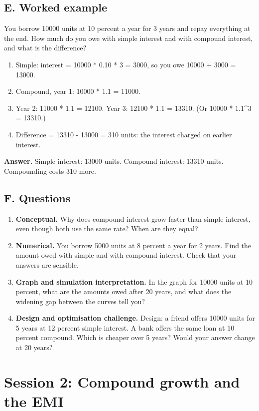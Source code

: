 \documentclass[11pt,a4paper]{article}
\begin{document}
\subsection*{E. Worked example}
You borrow 10000 units at 10 percent a year for 3 years and repay everything at the end. How much do you owe with simple interest and with compound interest, and what is the difference?
\begin{enumerate}[nosep]
\item Simple: interest = 10000 * 0.10 * 3 = 3000, so you owe 10000 + 3000 = 13000.
\item Compound, year 1: 10000 * 1.1 = 11000.
\item Year 2: 11000 * 1.1 = 12100. Year 3: 12100 * 1.1 = 13310. (Or 10000 * 1.1\textasciicircum{}3 = 13310.)
\item Difference = 13310 - 13000 = 310 units: the interest charged on earlier interest.
\end{enumerate}
\textbf{Answer.} Simple interest: 13000 units. Compound interest: 13310 units. Compounding costs 310 more.

\subsection*{F. Questions}
\begin{enumerate}[nosep]
\item \textbf{Conceptual.} Why does compound interest grow faster than simple interest, even though both use the same rate? When are they equal?
\item \textbf{Numerical.} You borrow 5000 units at 8 percent a year for 2 years. Find the amount owed with simple and with compound interest. Check that your answers are sensible.
\item \textbf{Graph and simulation interpretation.} In the graph for 10000 units at 10 percent, what are the amounts owed after 20 years, and what does the widening gap between the curves tell you?
\item \textbf{Design and optimisation challenge.} Design: a friend offers 10000 units for 5 years at 12 percent simple interest. A bank offers the same loan at 10 percent compound. Which is cheaper over 5 years? Would your answer change at 20 years?
\end{enumerate}

\section{Session 2: Compound growth and the EMI}
\end{document}
